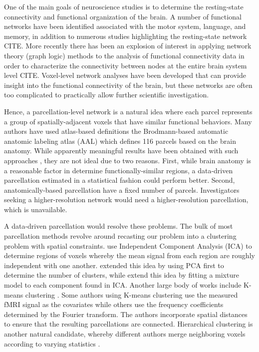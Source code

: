 {\color{blue}
One of the main goals of neuroscience studies is to determine
the resting-state connectivity and functional organization of the brain.
A number of functional networks have been identified associated with
the motor system, language, and memory, in addition to numerous
studies highlighting the resting-state network CITE.
More recently there has been an explosion of interest in applying
network theory (graph logic) methods to the analysis of functional
connectivity data in order to characterize the connectivity between
nodes at the entire brain system level CITE.
Voxel-level network analyses have been developed
that can provide insight into the functional connectivity
of the brain, but these networks are often too complicated to
practically allow further scientific investigation.

Hence, a parcellation-level network is a natural idea where
each parcel represents a group of spatially-adjacent voxels that
have similar functional behaviors. 
Many authors have used atlas-based definitions the Brodmann-based
automatic anatomic labeling atlas (AAL) \cite{tzourio2002automated}
which defines 116 parcels based on the brain anatomy.
While apparently meaningful results have
been obtained with such approaches \cite{hartman2011role, he2009uncovering, liu2008disrupted, lynall2010functional, power2011functional, salvador2005neurophysiological, spoormaker2010development, supekar2008network, tian2011hemisphere, wang2009parcellation}, they are not ideal due to two reasons.
First, while brain anatomy is a reasonable factor in determine
functionally-similar regions, a data-driven parcellation estimated in a
statistical fashion could perform better. Second, anatomically-based
parcellation have a fixed number of parcels. Investigators seeking a
higher-resolution network would need a higher-resolution parcellation,
which is unavailable.

A data-driven parcellation would resolve these problems. 
The bulk of most parcellation methods revolve around recasting our
problem into a clustering problem with spatial constraints.
\cite{biswal2010toward,smith2009correspondence} use Independent
Component Analysis (ICA) to determine regions of voxels whereby the
mean signal from each region are roughly independent with one another.
\cite{chen2008group} extended this idea by using PCA first to determine
the number of clusters, while
\cite{beckmann2005investigations, de2006fmri} extend this idea by
fitting a mixture model to each component found in ICA. Another large
body of works include K-means clustering \cite{flandin2002parcellation,mezer2009cluster,peltier2003detecting,thirion2006dealing}.
Some authors using K-means clustering use the measured fMRI signal as
the covariates while others use the frequency coefficients determined
by the Fourier transform. The authors incorporate spatial distances to
ensure that the resulting parcellations are connected. Hierarchical
clustering is another natural candidate, whereby different authors merge
neighboring voxels according to varying statistics \cite{diez2014novel,bellec2006identification,lu2003region,heller2006cluster}.

}
